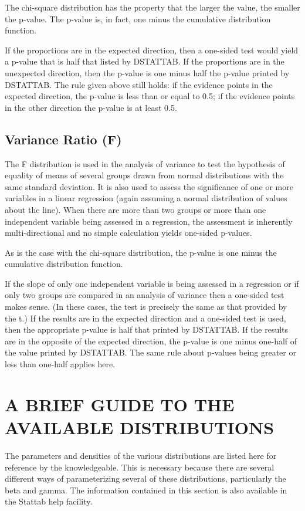 \documentclass[12pt,dvips]{article}
\newcommand{\mysection}[1]
    {\color{blue} \section{#1} \color{black}}
\newcommand{\mysubsection}[1]
    {\color{green}\subsection{#1}\color{black}}
\begin{document}
     The chi-square distribution has  the   property  that  the larger  the
     value, the smaller the  p-value.  The p-value  is,  in fact, one minus
     the cumulative distribution function.
     
     If  the proportions  are in the  expected  direction, then a one-sided
     test would yield a p-value that  is half that listed by DSTATTAB.   If
     the proportions  are in the  unexpected direction, then the p-value is
     one minus half the p-value printed  by DSTATTAB.  The rule given above
     still holds:  if  the evidence points in  the  expected direction, the
     p-value is less than or  equal to 0.5; if  the evidence points  in the
     other direction the p-value is at least 0.5.
     
\mysubsection{ Variance Ratio (F)}
     
     The F  distribution is used in the  analysis of variance  to  test the
     hypothesis of  equality  of means of  several groups drawn from normal
     distributions  with the same  standard deviation.  It is also  used to
     assess  the  significance  of one   or more  variables in   a   linear
     regression (again assuming a normal  distribution of values about  the
     line).  When   there   are more than two  groups   or more   than  one
     independent variable being assessed in a regression, the assessment is
     inherently  multi-directional  and    no simple  calculation    yields
     one-sided p-values.
     
     As is the case  with  the chi-square  distribution, the p-value is one
     minus the cumulative distribution function.
   
     If the slope of only one independent  variable is  being assessed in a
     regression or if  only   two  groups are  compared in   an analysis of
     variance then a one-sided test makes sense.  (In these cases, the test
     is precisely the same as that provided by the t.)   If the results are
     in the  expected direction  and a one-sided  test is   used,  then the
     appropriate p-value is  half that printed by  DSTATTAB. If the results
     are in  the opposite of  the  expected direction, the  p-value  is one
     minus one-half of the value printed by DSTATTAB.  The same  rule about
     p-values being greater or less than one-half applies here.

\mysection{A BRIEF GUIDE TO THE AVAILABLE DISTRIBUTIONS}
     
         The  parameters and  densities of  the  various distributions  are
     listed  here  for reference by  the knowledgeable.  This is  necessary
     because there are several different ways of  parameterizing several of
     these distributions, particularly the beta and gamma.  The information
     contained in  this section  is  also  available  in the   Stattab help
     facility.
     
\end{document}
